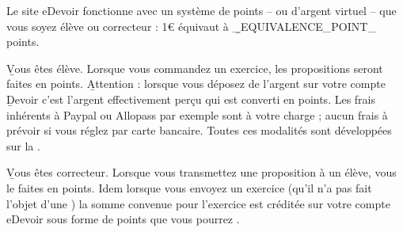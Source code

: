 Le site eDevoir fonctionne avec un système de points -- ou d'argent virtuel -- que vous soyez élève ou correcteur : 1€ équivaut à \b{_EQUIVALENCE_POINT_ points}.
\item \b{Vous êtes élève}. Lorsque vous commandez un exercice, les propositions seront faites en points. \b{Attention} : lorsque vous déposez de l'argent sur votre compte \b{Devoir} c'est l'argent effectivement perçu qui est converti en points. Les frais inhérents à Paypal ou Allopass par exemple sont à votre charge ; aucun frais à prévoir si vous réglez par carte bancaire. Toutes ces modalités sont développées sur la .
\item \b{Vous êtes correcteur}. Lorsque vous transmettez une proposition à un élève, vous le faites en points. Idem lorsque vous envoyez un exercice (qu'il n'a pas fait l'objet d'une ) la somme convenue pour l'exercice est créditée sur votre compte eDevoir sous forme de points que vous pourrez .